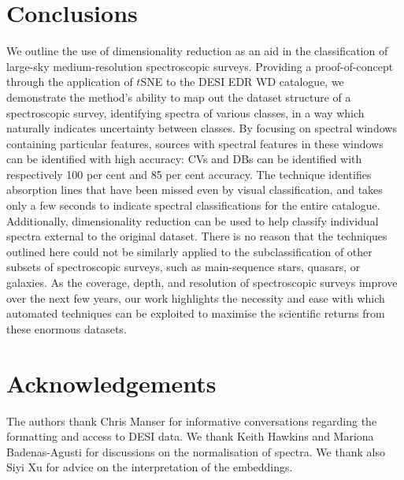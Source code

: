 \documentclass[fleqn,usenatbib]{mnras}
\begin{document}
\section{Conclusions}
\label{sec:conclusions}

We outline the use of dimensionality reduction as an aid in the classification of large-sky medium-resolution spectroscopic surveys.
Providing a proof-of-concept through the application of $t$SNE to the DESI EDR WD catalogue, we demonstrate the method's ability to map out the dataset structure of a spectroscopic survey, identifying spectra of various classes, in a way which naturally indicates uncertainty between classes.
By focusing on spectral windows containing particular features, sources with spectral features in these windows can be identified with high accuracy: CVs and DBs can be identified with respectively 100 per cent and 85 per cent accuracy.
The technique identifies absorption lines that have been missed even by visual classification, and takes only a few seconds to indicate spectral classifications for the entire catalogue.
Additionally, dimensionality reduction can be used to help classify individual spectra external to the original dataset.
There is no reason that the techniques outlined here could not be similarly applied to the subclassification of other subsets of spectroscopic surveys, such as main-sequence stars, quasars, or galaxies.
As the coverage, depth, and resolution of spectroscopic surveys improve over the next few years, our work highlights the necessity and ease with which automated techniques can be exploited to maximise the scientific returns from these enormous datasets.


\section*{Acknowledgements}

The authors thank Chris Manser for informative conversations regarding the formatting and access to DESI data.
We thank Keith Hawkins and Mariona Badenas-Agusti for discussions on the normalisation of spectra.
We thank also Siyi Xu for advice on the interpretation of the embeddings.
\end{document}
